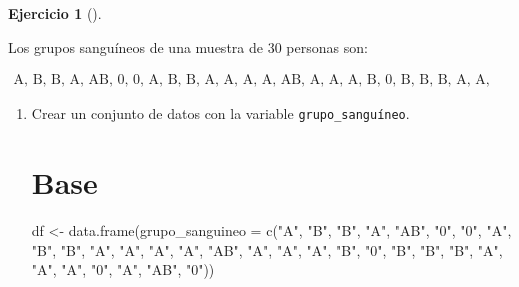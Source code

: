 \documentclass[
  spanish,
  a4paper,
]{scrreport}
\newenvironment{Shaded}{\begin{snugshade}}{\end{snugshade}}
\newcommand{\AttributeTok}[1]{\textcolor[rgb]{0.40,0.45,0.13}{#1}}
\newcommand{\FunctionTok}[1]{\textcolor[rgb]{0.28,0.35,0.67}{#1}}
\newcommand{\NormalTok}[1]{\textcolor[rgb]{0.00,0.23,0.31}{#1}}
\newcommand{\OtherTok}[1]{\textcolor[rgb]{0.00,0.23,0.31}{#1}}
\newcommand{\StringTok}[1]{\textcolor[rgb]{0.13,0.47,0.30}{#1}}
\theoremstyle{definition}
\newtheorem{exercise}{Ejercicio}[chapter]
\theoremstyle{remark}
\begin{document}
\begin{exercise}[]\protect\hypertarget{exr-frecuencias-graficos-grupo-sanguineo}{}\label{exr-frecuencias-graficos-grupo-sanguineo}

Los grupos sanguíneos de una muestra de 30 personas son:

\[
\begin{array}{c}
\mbox{A, B, B, A, AB, 0, 0, A, B, B, A, A, A, A, AB, A, A, A, B, 0, B, B, B, A, A, A, 0, A, AB, 0}
\end{array}
\]

\begin{enumerate}
\def\labelenumi{\alph{enumi}.}
\item
  Crear un conjunto de datos con la variable \texttt{grupo\_sanguíneo}.

  \begin{tcolorbox}[enhanced jigsaw, colback=white, coltitle=black, toprule=.15mm, rightrule=.15mm, opacitybacktitle=0.6, opacityback=0, bottomtitle=1mm, toptitle=1mm, titlerule=0mm, breakable, leftrule=.75mm, title=\textcolor{quarto-callout-tip-color}{\faLightbulb}\hspace{0.5em}{Solución}, arc=.35mm, left=2mm, bottomrule=.15mm, colframe=quarto-callout-tip-color-frame, colbacktitle=quarto-callout-tip-color!10!white]

  \section{Base}

\begin{Shaded}
\begin{Highlighting}[]
\NormalTok{df }\OtherTok{\textless{}{-}} \FunctionTok{data.frame}\NormalTok{(}\AttributeTok{grupo\_sanguineo =} \FunctionTok{c}\NormalTok{(}\StringTok{"A"}\NormalTok{, }\StringTok{"B"}\NormalTok{, }\StringTok{"B"}\NormalTok{, }\StringTok{"A"}\NormalTok{, }\StringTok{"AB"}\NormalTok{, }\StringTok{"0"}\NormalTok{, }\StringTok{"0"}\NormalTok{, }\StringTok{"A"}\NormalTok{, }\StringTok{"B"}\NormalTok{, }\StringTok{"B"}\NormalTok{, }\StringTok{"A"}\NormalTok{, }\StringTok{"A"}\NormalTok{, }\StringTok{"A"}\NormalTok{, }\StringTok{"A"}\NormalTok{, }\StringTok{"AB"}\NormalTok{, }\StringTok{"A"}\NormalTok{, }\StringTok{"A"}\NormalTok{, }\StringTok{"A"}\NormalTok{, }\StringTok{"B"}\NormalTok{, }\StringTok{"0"}\NormalTok{, }\StringTok{"B"}\NormalTok{, }\StringTok{"B"}\NormalTok{, }\StringTok{"B"}\NormalTok{, }\StringTok{"A"}\NormalTok{, }\StringTok{"A"}\NormalTok{, }\StringTok{"A"}\NormalTok{, }\StringTok{"0"}\NormalTok{, }\StringTok{"A"}\NormalTok{, }\StringTok{"AB"}\NormalTok{, }\StringTok{"0"}\NormalTok{))}
\end{Highlighting}
\end{Shaded}


\end{tcolorbox}
\end{enumerate}
\end{exercise}
\end{document}

